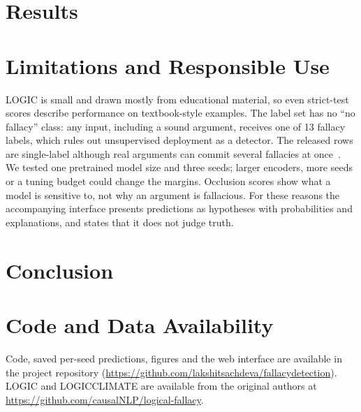 \documentclass[conference]{IEEEtran}
\begin{document}
\section{Results}



\section{Limitations and Responsible Use}
LOGIC is small and drawn mostly from educational material, so even strict-test scores describe performance on textbook-style examples. The label set has no ``no fallacy'' class: any input, including a sound argument, receives one of 13 fallacy labels, which rules out unsupervised deployment as a detector. The released rows are single-label although real arguments can commit several fallacies at once~\cite{helwe2024mafalda}. We tested one pretrained model size and three seeds; larger encoders, more seeds or a tuning budget could change the margins. Occlusion scores show what a model is sensitive to, not why an argument is fallacious. For these reasons the accompanying interface presents predictions as hypotheses with probabilities and explanations, and states that it does not judge truth.

\section{Conclusion}


\section*{Code and Data Availability}
Code, saved per-seed predictions, figures and the web interface are available in the project repository (\url{https://github.com/lakshitsachdeva/fallacydetection}). LOGIC and LOGICCLIMATE are available from the original authors at \url{https://github.com/causalNLP/logical-fallacy}.



\end{document}
